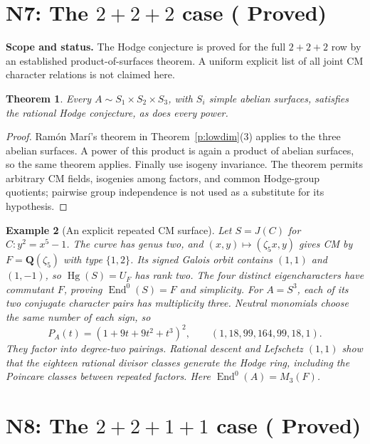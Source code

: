 \documentclass[11pt,reqno]{article}
\theoremstyle{emphasizedplain}
\DeclareRobustCommand{\provedstatus}{%
  \texorpdfstring{\textcolor{ProvedGreen}{\textbf{Proved}}}{Proved}}
\newtheorem{theorem}{Theorem}[section]
\theoremstyle{emphasizeddefinition}
\newtheorem{example}[theorem]{Example}
\theoremstyle{emphasizeddefinition}
\DeclareMathOperator{\End}{End}
\DeclareMathOperator{\Hg}{Hg}
\newcommand{\Q}{\mathbf Q}
\newcommand{\status}[1]{%
  \par\nobreak\smallskip\noindent
  {\setlength{\fboxsep}{7pt}%
   \colorbox{ScopeBackground}{%
    \parbox{\dimexpr\linewidth-2\fboxsep\relax}{%
     \small\textbf{\textcolor{HeadingInk}{Scope and status.}} #1}}}%
  \par\nobreak\medskip}
\begin{document}
\section{N7: The \texorpdfstring{$2+2+2$}{2+2+2} case (\provedstatus)}\label{sec:N7}

\status{The Hodge conjecture is proved for the full $2+2+2$ row by
an established product-of-surfaces theorem. A uniform explicit list of
all joint CM character relations is not claimed here.}
\begin{theorem}
Every $A\sim S_1\times S_2\times S_3$, with $S_i$ simple abelian
surfaces, satisfies the rational Hodge conjecture, as does every power.
\end{theorem}
\begin{proof}
Ram\'on Mar\'i's theorem in Theorem~\ref{p:lowdim}(3) applies to the
three abelian surfaces. A power of this product is again a product of
abelian surfaces, so the same theorem applies. Finally use isogeny
invariance. The theorem permits arbitrary CM fields, isogenies among
factors, and common Hodge-group quotients; pairwise group independence
is not used as a substitute for its hypothesis.
\end{proof}
\begin{example}[An explicit repeated CM surface]\label{ex:CMsurface}
Let $S=J(C)$ for $C:y^2=x^5-1$. The curve has genus two, and
$(x,y)\mapsto(\zeta_5x,y)$ gives CM by $F=\Q(\zeta_5)$ with type
$\{1,2\}$. Its signed Galois orbit contains $(1,1)$ and $(1,-1)$,
so $\Hg(S)=U_F$ has rank two. The four distinct eigencharacters have
commutant $F$, proving $\End^0(S)=F$ and simplicity.
For $A=S^3$, each of its two conjugate character pairs has multiplicity
three. Neutral monomials choose the same number of each sign, so
\[
 P_A(t)=(1+9t+9t^2+t^3)^2,
 \qquad (1,18,99,164,99,18,1).
\]
They factor into degree-two pairings. Rational descent and Lefschetz
$(1,1)$ show that the eighteen rational divisor classes generate the
Hodge ring, including the Poincare classes between repeated factors.
Here $\End^0(A)=M_3(F)$.
\end{example}
\section{N8: The \texorpdfstring{$2+2+1+1$}{2+2+1+1} case (\provedstatus)}\label{sec:N8}
\end{document}
